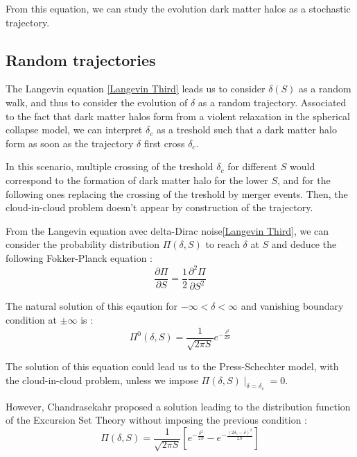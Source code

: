 From this equation, we can study the evolution dark matter halos as a stochastic trajectory.

\subsection{Random trajectories}

The Langevin equation \ref{Langevin Third} leads us to consider $\delta(S)$ as a random walk, and thus to consider the evolution of $\delta$ as a random trajectory. Associated to the fact that dark matter halos form from a violent relaxation in the spherical collapse model, we can interpret $\delta_c$ as a treshold such that a dark matter halo form as soon as the trajectory $\delta$ first cross $\delta_c$.

In this scenario, multiple crossing of the treshold $\delta_c$ for different $S$ would correspond to the formation of dark matter halo for the lower $S$, and for the following ones replacing the crossing of the treshold by merger events. Then, the cloud-in-cloud problem doesn't appear by construction of the trajectory.

From the Langevin equation avec delta-Dirac noise\ref{Langevin Third}, we can consider the probability distribution $\Pi (\delta, S)$ to reach $\delta$ at $S$ and deduce the following Fokker-Planck equation :
\begin{equation}
\label{Fokker-Planck}
\frac{\partial \Pi}{\partial S} = \frac{1}{2} \frac{\partial^2 \Pi}{\partial S^2}
\end{equation}

The natural solution of this eqaution for $-\infty < \delta < \infty$ and vanishing boundary condition at $\pm \infty$ is :
\begin{equation}
\label{Sol Fokker}
\Pi^0(\delta, S) = \frac{1}{\sqrt{2\pi S}} e^{-\frac{\delta^2}{2S}}
\end{equation}

The solution of this equation could lead us to the Press-Schechter model, with the cloud-in-cloud problem, unless we impose $\Pi (\delta, S) \mid_{\delta = \delta_c} = 0$.

However, Chandrasekahr proposed a solution\cite{Chandrasekhar} leading to the distribution function of the Excursion Set Theory without imposing the previous condition :
\begin{equation}
\label{Chandrasekhar Equation}
\Pi (\delta, S) = \frac{1}{\sqrt{2\pi S}} \left[e^{-\frac{\delta^2}{2S}} - e^{-\frac{(2\delta_c - \delta)^2}{2S}} \right]
\end{equation}

